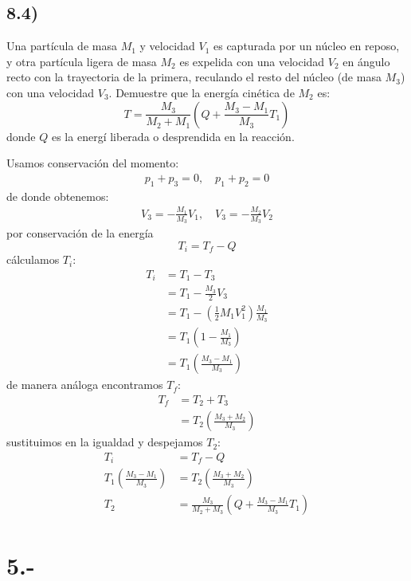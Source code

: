 \documentclass{article}
\begin{document}
\subsection*{8.4)}
Una partícula de masa $M_1$ y velocidad $V_1$ es capturada por un núcleo en reposo,
y otra partícula ligera de masa $M_2$ es expelida con una velocidad $V_2$ en ángulo 
recto con la trayectoria de la primera, reculando el resto del núcleo (de masa $M_3$)
con una velocidad $V_3$. Demuestre que la energía cinética de $M_2$ es:
\[ T = \frac{M_3}{M_2+M_1} \left( Q + \frac{M_3-M_1}{M_3}T_1 \right) \]
donde $Q$ es la energí liberada o desprendida en la reacción.
\begin{tcolorbox}[breakable]
    Usamos conservación del momento:
    \begin{align*}
        p_1 + p_3 = 0, \quad p_1 + p_2 = 0
    \end{align*}
    de donde obtenemos:
    \begin{align*}
        V_3 = -\frac{M_1}{M_3}V_1, \quad V_3 = -\frac{M_2}{M_3}V_2
    \end{align*}
    por conservación de la energía 
    \[T_i = T_f-Q \] 
    cálculamos $T_i$:
    \begin{align*}
        T_i 
        &= T_1 - T_3 \\
        &= T_1 - \frac{M_3}{2}V_3 \\
        &= T_1 - \left( \frac{1}{2}M_1V_1^2 \right)\frac{M_1}{M_3} \\
        &= T_1\left( 1 - \frac{M_1}{M_3} \right) \\
        &= T_1\left( \frac{M_3-M_1}{M_3} \right)
    \end{align*}
    de manera análoga encontramos $T_f$:
    \begin{align*}
        T_f 
        &= T_2 + T_3 \\
        &= T_2\left( \frac{M_3+M_2}{M_3} \right)
    \end{align*}
    sustituimos en la igualdad y despejamos $T_2$:
    \begin{align*}
        T_i &= T_f-Q \\
        T_1\left( \frac{M_3-M_1}{M_3} \right) &= T_2\left( \frac{M_3+M_2}{M_3} \right) \\
        T_2 &= \frac{M_3}{M_2+M_3}\left( Q + \frac{M_3-M_1}{M_3}T_1 \right)
    \end{align*}
\end{tcolorbox}

\section*{5.-}
\end{document}
